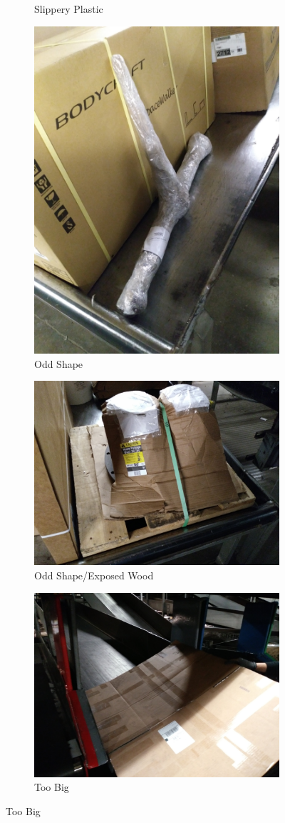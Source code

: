 \documentclass[12pt]{article}
\begin{document}
\begin{figure}[H]
\begin{subfigure}{0.5\textwidth}
\caption{Slippery Plastic}
\end{subfigure}
\begin{subfigure}{0.5\textwidth}
\centering
\includegraphics[width=0.4\linewidth]{20171222_022232.jpg}
\caption{Odd Shape}
\end{subfigure}
\begin{subfigure}{0.5\textwidth}
\centering
\includegraphics[width=0.4\linewidth]{20171222_022213.jpg}
\caption{Odd Shape/Exposed Wood}
\end{subfigure}
\begin{subfigure}{0.5\textwidth}
\centering
\includegraphics[width=0.4\linewidth]{20171221_175349.jpg}
\caption{Too Big}
\end{subfigure}
\end{figure}
\clearpage



\end{document}

